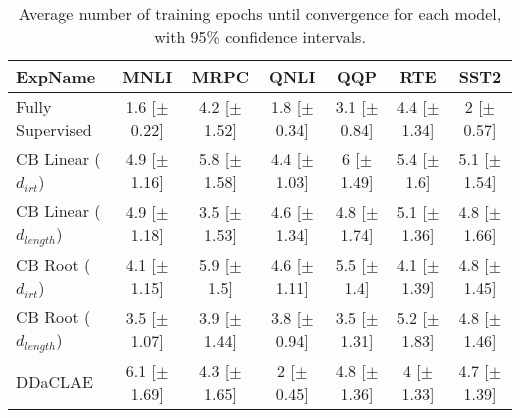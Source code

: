 \begin{table*}[ht]
\centering
\begingroup\small
\begin{tabular}{lcccccc}
  \hline
ExpName & MNLI & MRPC & QNLI & QQP & RTE & SST2 \\ 
  \hline
Fully Supervised & 1.6 [$\pm$0.22] & 4.2 [$\pm$1.52] & 1.8 [$\pm$0.34] & 3.1 [$\pm$0.84] & 4.4 [$\pm$1.34] & 2 [$\pm$0.57] \\ 
  CB Linear ($d_{irt}$) & 4.9 [$\pm$1.16] & 5.8 [$\pm$1.58] & 4.4 [$\pm$1.03] & 6 [$\pm$1.49] & 5.4 [$\pm$1.6] & 5.1 [$\pm$1.54] \\ 
  CB Linear ($d_{length}$) & 4.9 [$\pm$1.18] & 3.5 [$\pm$1.53] & 4.6 [$\pm$1.34] & 4.8 [$\pm$1.74] & 5.1 [$\pm$1.36] & 4.8 [$\pm$1.66] \\ 
  CB Root ($d_{irt}$) & 4.1 [$\pm$1.15] & 5.9 [$\pm$1.5] & 4.6 [$\pm$1.11] & 5.5 [$\pm$1.4] & 4.1 [$\pm$1.39] & 4.8 [$\pm$1.45] \\ 
  CB Root ($d_{length}$) & 3.5 [$\pm$1.07] & 3.9 [$\pm$1.44] & 3.8 [$\pm$0.94] & 3.5 [$\pm$1.31] & 5.2 [$\pm$1.83] & 4.8 [$\pm$1.46] \\ 
  DDaCLAE & 6.1 [$\pm$1.69] & 4.3 [$\pm$1.65] & 2 [$\pm$0.45] & 4.8 [$\pm$1.36] & 4 [$\pm$1.33] & 4.7 [$\pm$1.39] \\ 
   \hline
\end{tabular}
\endgroup
\caption{Average number of training epochs until convergence for each model, with 95\% confidence intervals.} 
\label{tab:epoch_bert-False}
\end{table*}
